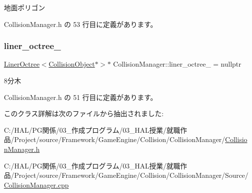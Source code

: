地面ポリゴン 



 Collision\+Manager.\+h の 53 行目に定義があります。

\mbox{\label{class_collision_manager_aaaf833204e8ac7f3d649801abb95ecf5}} 
\subsubsection{\texorpdfstring{liner\+\_\+octree\+\_\+}{liner\_octree\_}}
{\footnotesize\ttfamily \mbox{\hyperlink{class_liner_octree}{Liner\+Octree}}$<$\mbox{\hyperlink{class_collision_object}{Collision\+Object}}$\ast$$>$$\ast$ Collision\+Manager\+::liner\+\_\+octree\+\_\+ = nullptr\hspace{0.3cm}{\ttfamily [private]}}



8分木 



 Collision\+Manager.\+h の 51 行目に定義があります。



このクラス詳解は次のファイルから抽出されました\+:\begin{DoxyCompactItemize}
\item 
C\+:/\+H\+A\+L/\+P\+G関係/03\+\_\+作成プログラム/03\+\_\+\+H\+A\+L授業/就職作品/\+Project/source/\+Framework/\+Game\+Engine/\+Collision/\+Collision\+Manager/\mbox{\hyperlink{_collision_manager_8h}{Collision\+Manager.\+h}}\item 
C\+:/\+H\+A\+L/\+P\+G関係/03\+\_\+作成プログラム/03\+\_\+\+H\+A\+L授業/就職作品/\+Project/source/\+Framework/\+Game\+Engine/\+Collision/\+Collision\+Manager/\+Source/\mbox{\hyperlink{_collision_manager_8cpp}{Collision\+Manager.\+cpp}}\end{DoxyCompactItemize}
